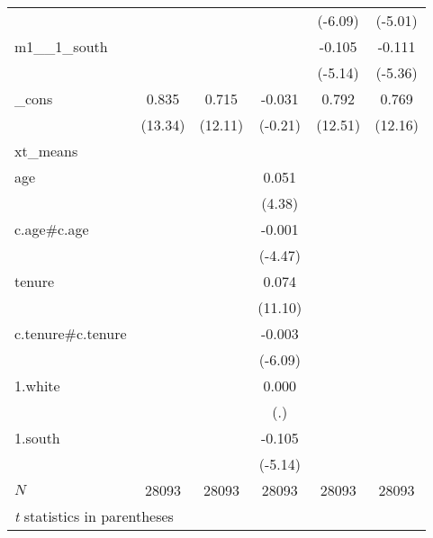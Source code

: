 \begin{tabular}{l*{5}{c}}
            &            &            &            &     (-6.09)&     (-5.01)\\
m1\_\_1\_south &            &            &            &      -0.105&      -0.111\\
            &            &            &            &     (-5.14)&     (-5.36)\\
\_cons      &       0.835&       0.715&      -0.031&       0.792&       0.769\\
            &     (13.34)&     (12.11)&     (-0.21)&     (12.51)&     (12.16)\\
\hline
xt\_means    &            &            &            &            &            \\
age         &            &            &       0.051&            &            \\
            &            &            &      (4.38)&            &            \\
c.age\#c.age &            &            &      -0.001&            &            \\
            &            &            &     (-4.47)&            &            \\
tenure      &            &            &       0.074&            &            \\
            &            &            &     (11.10)&            &            \\
c.tenure\#c.tenure&            &            &      -0.003&            &            \\
            &            &            &     (-6.09)&            &            \\
1.white     &            &            &       0.000&            &            \\
            &            &            &         (.)&            &            \\
1.south     &            &            &      -0.105&            &            \\
            &            &            &     (-5.14)&            &            \\
\hline
\(N\)       &       28093&       28093&       28093&       28093&       28093\\
\hline\hline
\multicolumn{6}{l}{\footnotesize \textit{t} statistics in parentheses}\\
\end{tabular}
